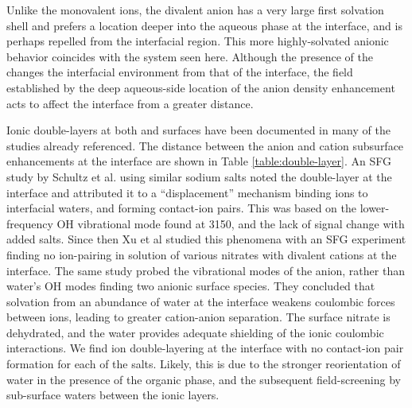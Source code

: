 Unlike the monovalent ions, the divalent \sul anion has a very large first solvation shell and prefers a location deeper into the aqueous phase at the \airwat interface,\cite{Salvador2003} and is perhaps repelled from the interfacial region.\cite{Gopalakrishnan2005} This more highly-solvated anionic behavior coincides with the \ctcwat system seen here. Although the presence of the \ctc changes the interfacial environment from that of the \airwat interface, the field established by the deep aqueous-side location of the \sul anion density enhancement acts to affect the interface from a greater distance. 


Ionic double-layers at both \airwat and \ctcwat surfaces have been documented in many of the studies already referenced. The distance between the anion and cation subsurface enhancements at the \ctcwat interface are shown in Table \ref{table:double-layer}. An SFG study by Schultz et al. using similar sodium salts noted the double-layer at the \airwat interface and attributed it to a ``displacement'' mechanism binding ions to interfacial waters, and forming contact-ion pairs. This was based on the lower-frequency OH vibrational mode found at 3150\cm, and the lack of signal change with added salts. Since then Xu et al studied this phenomena with an SFG experiment finding no ion-pairing in solution of various nitrates with divalent cations at the \airwat interface.\cite{Xu2009} The same study probed the vibrational modes of the \nit anion, rather than water's OH modes finding two anionic surface species. They concluded that solvation from an abundance of water at the interface weakens coulombic forces between ions, leading to greater cation-anion separation. The surface nitrate is dehydrated, and the water provides adequate shielding of the ionic coulombic interactions. We find ion double-layering at the \ctcwat interface with no contact-ion pair formation for each of the salts. Likely, this is due to the stronger reorientation of water in the presence of the organic phase, and the subsequent field-screening by sub-surface waters between the ionic layers.

